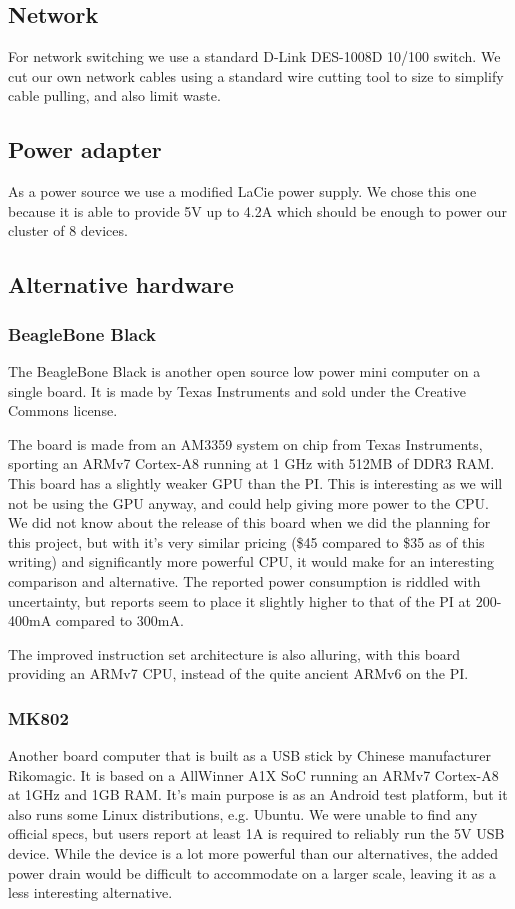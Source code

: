 \subsection{Network}
For network switching we use a standard D-Link DES-1008D 10/100 switch. We cut our own network cables using a standard wire cutting tool to size to simplify cable pulling, and also limit waste.

\subsection{Power adapter}
As a power source we use a modified LaCie power supply. We chose this one because it is able to provide 5V up to 4.2A which should be enough to power our cluster of 8 devices. 

\subsection{Alternative hardware}

\subsubsection{BeagleBone Black}
The BeagleBone Black is another open source low power mini computer on a single board. It is made by Texas Instruments and sold under the Creative Commons license.

The board is made from an AM3359 system on chip from Texas Instruments, sporting an ARMv7 Cortex-A8 running at 1 GHz with 512MB of DDR3 RAM. This board has a slightly weaker GPU than the PI. This is interesting as we will not be using the GPU anyway, and could help giving more power to the CPU.
We did not know about the release of this board when we did the planning for this project, but with it's very similar pricing (\$45 compared to \$35 as of this writing) and significantly more powerful CPU, it would make for an interesting comparison and alternative. The reported power consumption is riddled with uncertainty, but reports seem to place it slightly higher to that of the PI at 200-400mA compared to 300mA.

The improved instruction set architecture is also alluring, with this board providing an ARMv7 CPU, instead of the quite ancient ARMv6 on the PI.

\subsubsection{MK802}
Another board computer that is built as a USB stick by Chinese manufacturer Rikomagic.
It is based on a AllWinner A1X SoC running an ARMv7 Cortex-A8 at 1GHz and 1GB RAM. It's main purpose is as an Android test platform, but it also runs some Linux distributions, e.g. Ubuntu.
We were unable to find any official specs, but users report at least 1A is required to reliably run the 5V USB device. 
While the device is a lot more powerful than our alternatives, the added power drain would be difficult to accommodate on a larger scale, leaving it as a less interesting alternative.

